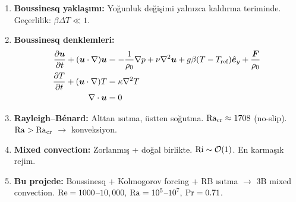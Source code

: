 \begin{enumerate}
    \item \textbf{Boussinesq yaklaşımı:} Yoğunluk değişimi yalnızca kaldırma teriminde. Geçerlilik: $\beta\Delta T \ll 1$.

    \item \textbf{Boussinesq denklemleri:}
    \begin{align*}
        \frac{\partial \bm{u}}{\partial t} + (\bm{u}\cdot\nabla)\bm{u} &= -\frac{1}{\rho_0}\nabla p + \nu\nabla^2\bm{u} + g\beta(T-T_{\text{ref}})\hat{\bm{e}}_y + \frac{\bm{F}}{\rho_0} \\
        \frac{\partial T}{\partial t} + (\bm{u}\cdot\nabla)T &= \kappa\nabla^2 T \\
        \nabla \cdot\bm{u} &= 0
    \end{align*}

    \item \textbf{Rayleigh--Bénard:} Alttan ısıtma, üstten soğutma. $\mathrm{Ra}_{\text{cr}} \approx 1708$ (no-slip). $\mathrm{Ra} > \mathrm{Ra}_{\text{cr}}$ $\to$ konveksiyon.

    \item \textbf{Mixed convection:} Zorlanmış + doğal birlikte. $\mathrm{Ri} \sim \mathcal{O}(1)$. En karmaşık rejim.

    \item \textbf{Bu projede:} Boussinesq + Kolmogorov forcing + RB ısıtma $\to$ 3B mixed convection. $\mathrm{Re} = 1000$--$10{,}000$, $\mathrm{Ra} = 10^5$--$10^7$, $\mathrm{Pr} = 0.71$.
\end{enumerate}
